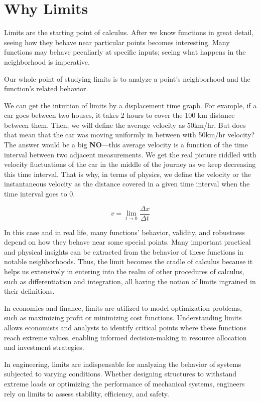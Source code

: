 \section{Why Limits}

Limits are the starting point of calculus. After we know functions in great detail, seeing how they behave near particular points becomes interesting. Many functions may behave peculiarly at specific inputs; seeing what happens in the neighborhood is imperative. 

Our whole point of studying limits is to analyze a point's neighborhood and the function's related behavior. 

We can get the intuition of limits by a displacement time graph. For example, if a car goes between two houses, it takes 2 hours to cover the 100 km distance between them. Then, we will define the average velocity as 50km/hr. But does that mean that the car was moving uniformly in between with 50km/hr velocity? The answer would be a big \textbf{NO}—this average velocity is a function of the time interval between two adjacent measurements. We get the real picture riddled with velocity fluctuations of the car in the middle of the journey as we keep decreasing this time interval. That is why, in terms of physics, we define the velocity or the instantaneous velocity as the distance covered in a given time interval when the time interval goes to 0.

$$v =\lim_{t\to 0}\frac{\Delta x}{\Delta t}$$

In this case and in real life, many functions' behavior, validity, and robustness depend on how they behave near some special points. Many important practical and physical insights can be extracted from the behavior of these functions in notable neighborhoods. Thus, the limit becomes the cradle of calculus because it helps us extensively in entering into the realm of other procedures of calculus, such as differentiation and integration, all having the notion of limits ingrained in their definitions. 

In economics and finance, limits are utilized to model optimization problems, such as maximizing profit or minimizing cost functions. Understanding limits allows economists and analysts to identify critical points where these functions reach extreme values, enabling informed decision-making in resource allocation and investment strategies.

In engineering, limits are indispensable for analyzing the behavior of systems subjected to varying conditions. Whether designing structures to withstand extreme loads or optimizing the performance of mechanical systems, engineers rely on limits to assess stability, efficiency, and safety.

